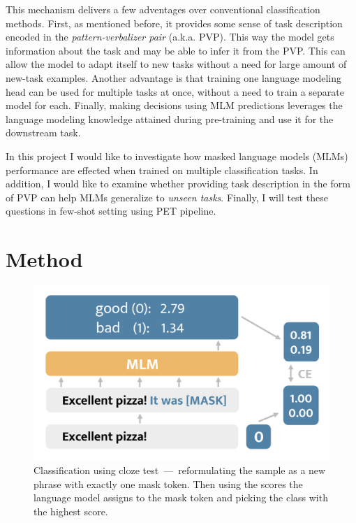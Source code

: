 \documentclass[11pt,a4paper]{article}
\begin{document}
This mechanism delivers a few adventages over conventional classification methods.
First, as mentioned before, it provides some sense of task description encoded in the \textit{pattern-verbalizer pair} (a.k.a. PVP).
This way the model gets information about the task and may be able to infer it from the PVP.
This can allow the model to adapt itself to new tasks without a need for large amount of new-task examples.
Another advantage is that training one language modeling head can be used for multiple tasks at once, without a need to train a separate model for each.
Finally, making decisions using MLM predictions leverages the language modeling knowledge attained during pre-training and use it for the downstream task.

In this project I would like to investigate how masked language models (MLMs) performance are effected when trained on multiple classification tasks.
In addition, I would like to examine whether providing task description in the form of PVP can help MLMs generalize to \textit{unseen tasks}.
Finally, I will test these questions in few-shot setting using PET pipeline.

\section{Method}
\label{sec:method}

\begin{figure}[h]
	\centering
	\includegraphics[width=\linewidth]{mlm_classification}
	\caption{Classification using cloze test~---~reformulating the sample as a new phrase with exactly one mask token. Then using the scores the language model assigns to the mask token and picking the class with the highest score.}
	\label{fig:method}
\end{figure}
\end{document}
